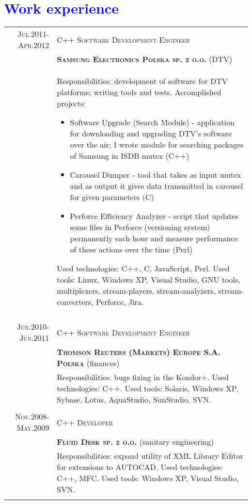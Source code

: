 \documentclass[a4paper,12pt]{article}
\begin{document}
\section{\textcolor{Blue}{Work experience}}
\begin{tabular}{r|p{12cm}}
	\textsc{Jul.2011-Apr.2012}
	&\textsc{C++ Software Development Engineer}\\
	&\textsc{\textbf{Samsung Electronics Polska sp. z o.o.}} (DTV)\\
	&\footnotesize{
		Responsibilities: development of software for DTV platforms; writing tools and tests.\newline
		Accomplished projects:
			\begin{itemize}
				\item Software Upgrade (Search Module) - application for downloading and upgrading DTV's software over the air; I wrote module for
				searching packages of Samsung in ISDB mutex (C++)
				\item Carousel Dumper - tool that takes as input mutex and as output it gives data transmitted in carousel for given parameters (C)
				\item Perforce Efficiency Analyzer - script that updates some files in Perforce (versioning system) permanently each hour and measure
				performance of these actions over the time (Perl)
			\end{itemize}
		Used technologies: C++, C, JavaScript, Perl. Used tools: Linux, Windows XP, Visual Studio, GNU tools, multiplexers,
		stream-players, stream-analyzers, stream-converters, Perforce, Jira.
	}\\
	\multicolumn{2}{c}{}\\

	\textsc{Jun.2010-Jun.2011}
	&\textsc{C++ Software Development Engineer}\\
	&\textsc{\textbf{Thomson Reuters (Markets) Europe S.A. Polska}} (finances)\\
	&\footnotesize{ Responsibilities: bugs fixing in the Kondor+. Used technologies: C++.
		Used tools: Solaris, Windows XP, Sybase, Lotus, AquaStudio, SunStudio, SVN.}\\
	\multicolumn{2}{c}{}\\

	\textsc{Nov.2008-May.2009}
	&\textsc{C++ Developer}\\
	&\textsc{\textbf{Fluid Desk sp. z o.o.}} (sanitary engineering)\\
	&\footnotesize{Responsibilities: expand utility of XML Library Editor for extensions
		to AUTOCAD. Used technologies: C++, MFC. Used tools: Windows XP, Visual Studio, SVN.}\\
	\multicolumn{2}{c}{}\\
\end{tabular}
\end{document}
